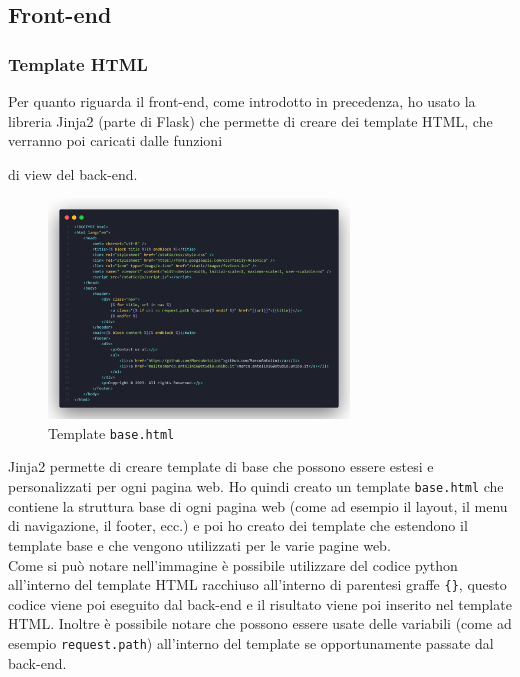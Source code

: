 \documentclass[12pt]{article}
\def\code#1{\texttt{#1}}
\begin{document}
\newpage


\subsection{Front-end}

\subsubsection{Template HTML}

\justifying
Per quanto riguarda il front-end, come introdotto in precedenza, ho usato la libreria Jinja2 (parte di Flask) che permette di creare dei template HTML, che verranno poi caricati dalle funzioni \raggedright di view del back-end.
\begin{figure}
    \includegraphics[width=8cm]{base-template.png}
    \caption{Template \code{base.html}}
    \centering
\end{figure}
\justifying
Jinja2 permette di creare template di base che possono essere estesi e personalizzati per ogni pagina web. Ho quindi creato un template \code{base.html} che contiene la struttura base di ogni pagina web (come ad esempio il layout, il menu di navigazione, il footer, ecc.) e poi ho creato dei template che estendono il template base e che vengono utilizzati per le varie pagine web. \\
Come si può notare nell'immagine è possibile utilizzare del codice python all'interno del template HTML racchiuso all'interno di parentesi graffe \code{\{\}}, questo codice viene poi eseguito dal back-end e il risultato viene poi inserito nel template HTML. Inoltre è possibile notare che possono essere usate delle variabili (come ad esempio \code{request.path}) all'interno del template se opportunamente passate dal back-end. \@
\end{document}
